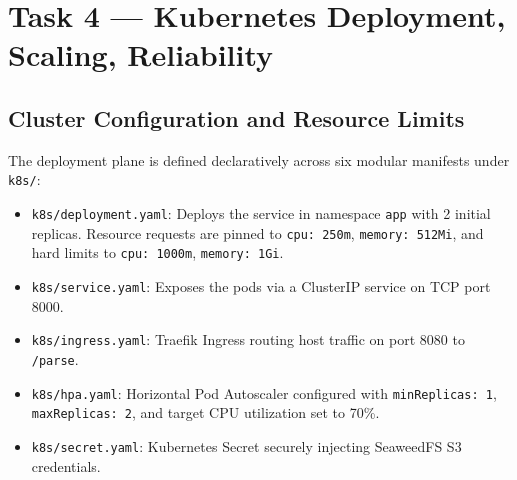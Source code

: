 \documentclass[10pt,a4paper]{article}
\begin{document}
\vspace{0.25cm}

\section{Task 4 --- Kubernetes Deployment, Scaling, Reliability}

\subsection{Cluster Configuration and Resource Limits}
The deployment plane is defined declaratively across six modular manifests under \texttt{k8s/}:
\begin{itemize}[noitemsep,topsep=2pt,leftmargin=*]
    \item \texttt{k8s/deployment.yaml}: Deploys the service in namespace \texttt{app} with 2 initial replicas. Resource requests are pinned to \texttt{cpu: 250m}, \texttt{memory: 512Mi}, and hard limits to \texttt{cpu: 1000m}, \texttt{memory: 1Gi}.
    \item \texttt{k8s/service.yaml}: Exposes the pods via a ClusterIP service on TCP port 8000.
    \item \texttt{k8s/ingress.yaml}: Traefik Ingress routing host traffic on port 8080 to \texttt{/parse}.
    \item \texttt{k8s/hpa.yaml}: Horizontal Pod Autoscaler configured with \texttt{minReplicas: 1}, \texttt{maxReplicas: 2}, and target CPU utilization set to 70\%.
    \item \texttt{k8s/secret.yaml}: Kubernetes Secret securely injecting SeaweedFS S3 credentials.
\end{itemize}
\end{document}
